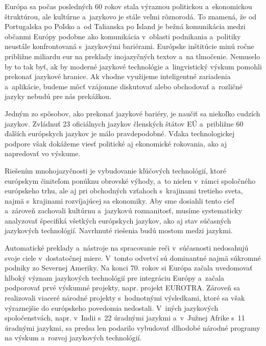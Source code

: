 \cleardoublepage

\setcounter{page}{1}
\pagestyle{scrheadings}

\begin{multicols}{2}
Európa sa počas posledných 60 rokov stala výraznou politickou
a~ekonomickou štruktúrou, ale kultúrne a~jazykovo je stále
veľmi rôznorodá. To znamená, že od Portugalska po Poľsko
a~od Talianska po Island je bežná komunikácia medzi občanmi Európy podobne ako komunikácia v~oblasti podnikania a~politiky neustále konfrontovaná s~jazykovými bariérami. Európske inštitúcie minú ročne približne miliardu eur na preklady inojazyčných textov a~na tlmočenie. Nemuselo by to tak byť, ak by moderné jazykové technológie a~lingvistický výskum pomohli prekonať jazykové hranice. Ak vhodne využijeme inteligentné zariadenia a~aplikácie, budeme môcť vzájomne diskutovať alebo obchodovať a~rozličné jazyky nebudú pre nás prekážkou.


Jedným zo spôsobov, ako prekonať jazykové bariéry, je naučiť sa
niekoľko cudzích jazykov. Zvládnuť 23 oficiálnych jazykov
členských štátov EÚ a~približne 60 ďalších európskych jazykov
je málo pravdepodobné. Vďaka technologickej podpore však dokážeme
viesť politické aj ekonomické rokovania, ako aj napredovať vo
výskume.

Riešením mnohojazyčnosti je vybudovanie kľúčových technológií,
ktoré európskym činiteľom ponúknu obrovské výhody, a~to nielen
v~rámci spoločného európskeho trhu, ale aj pri obchodných vzťahoch
s~krajinami  tretieho sveta, najmä s~krajinami rozvíjajúcej sa
ekonomiky. Aby sme dosiahli tento cieľ a~zároveň zachovali kultúrnu
a~jazykovú rozmanitosť, musíme systematicky analyzovať špecifiká
všetkých európskych jazykov, ako aj stav súčasných jazykových
technológií. Navrhnuté riešenia budú mostom medzi jazykmi.

Automatické preklady a~nástroje na spracovanie reči
v~súčasnosti nedosahujú svoje ciele v~dostatočnej miere. V~tomto
odvetví sú dominantné najmä súkromné podniky zo Severnej Ameriky.
Na konci 70. rokov si Európa začala uvedomovať hlboký význam
jazykových technológií pre integráciu Európy a~začala podporovať
prvé výskumné projekty, napr. projekt EUROTRA. Zároveň sa
realizovali viaceré národné projekty s~hodnotnými výsledkami,
ktoré sa však výraznejšie do európskeho povedomia nedostali.
V~iných jazykových spoločenstvách, napr. v~Indii s~22 úradnými
jazykmi a~v~Južnej Afrike s~11 úradnými jazykmi, sa predsa len
podarilo vybudovať dlhodobé národné programy na výskum a~rozvoj
jazykových technológií.


\end{multicols}
